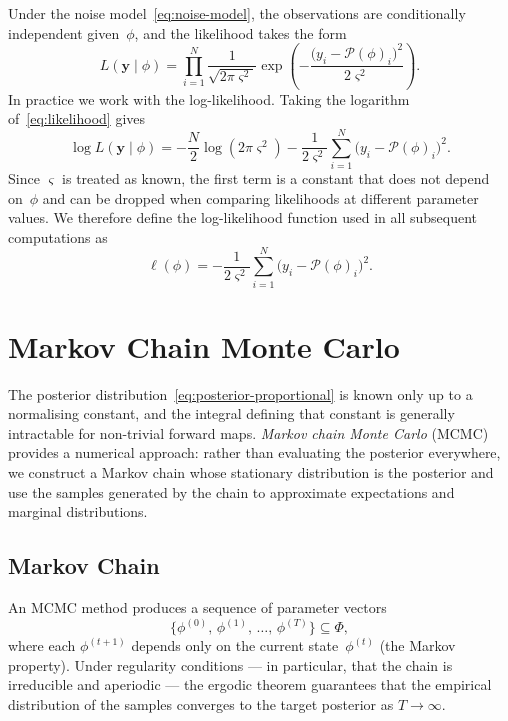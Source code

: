 Under the noise model~\cref{eq:noise-model}, the observations are
conditionally independent given~$\phi$, and the likelihood takes the
form
\begin{equation}
  L(\mathbf{y} \mid \phi)
  = \prod_{i=1}^{N} \frac{1}{\sqrt{2\pi\varsigma^2}}
  \exp\!\left(
    -\frac{\big(y_i - \mathcal{P}(\phi)_i\big)^2}{2\varsigma^2}
  \right).
  \label{eq:likelihood}
\end{equation}
In practice we work with the log-likelihood. Taking the logarithm
of~\cref{eq:likelihood} gives
\begin{equation}
  \log L(\mathbf{y} \mid \phi)
  = -\frac{N}{2}\log(2\pi\varsigma^2)
  - \frac{1}{2\varsigma^2}
  \sum_{i=1}^{N}\big(y_i - \mathcal{P}(\phi)_i\big)^2.
  \label{eq:full-log-likelihood}
\end{equation}
Since $\varsigma$ is treated as known, the first term is a constant that
does not depend on~$\phi$ and can be dropped when comparing likelihoods
at different parameter values. We therefore define the log-likelihood
function used in all subsequent computations as
\begin{equation}
  \ell(\phi)
  = -\frac{1}{2\varsigma^2}
  \sum_{i=1}^{N}\big(y_i - \mathcal{P}(\phi)_i\big)^2.
  \label{eq:log-likelihood}
\end{equation}

\section{Markov Chain Monte Carlo}\label{sec:mcmc}

The posterior distribution~\cref{eq:posterior-proportional} is known only
up to a normalising constant, and the integral defining that constant is
generally intractable for non-trivial forward maps. \emph{Markov chain
Monte Carlo} (MCMC) provides a numerical approach: rather than evaluating
the posterior everywhere, we construct a Markov chain whose stationary
distribution is the posterior and use the samples generated by the chain
to approximate expectations and marginal distributions.

\subsection{Markov Chain}

An MCMC method produces a sequence of parameter vectors
\begin{equation}
  \big\{\phi^{(0)},\, \phi^{(1)},\, \ldots,\, \phi^{(T)}\big\}
  \subseteq \Phi,
\end{equation}
where each $\phi^{(t+1)}$ depends only on the current
state~$\phi^{(t)}$ (the Markov property). Under regularity conditions ---
in particular, that the chain is irreducible and aperiodic --- the
ergodic theorem guarantees that the empirical distribution of the samples
converges to the target posterior as $T \to \infty$.

